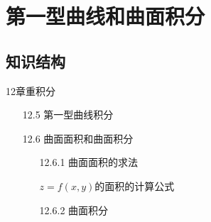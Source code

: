 \documentclass[12pt,UTF8]{ctexart}
\begin{document}
\setcounter{section}{19}
\section{第一型曲线和曲面积分}
\subsection{知识结构}
12章重积分
	\begin{enumerate}
		\item[12.5]第一型曲线积分
		\item[12.6]曲面面积和曲面积分
			\begin{enumerate}
				\item[12.6.1]曲面面积的求法
					\begin{itemize}
						$z=f(x,y)$的面积的计算公式
					\end{itemize}
				\item[12.6.2]曲面积分
			\end{enumerate}
	\end{enumerate}
\end{document}
